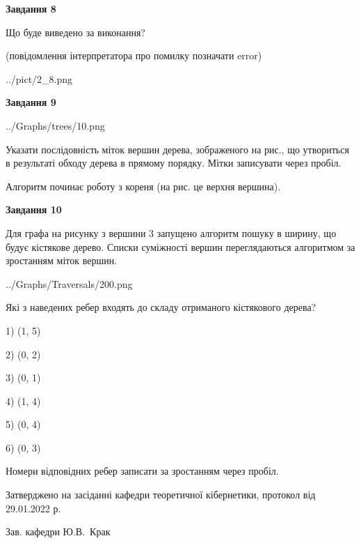 \documentclass[12pt, ukrainian]{article}
\begin{document}
{\begin {large}
{\begin {center}\textbf{Завдання 8}\end {center}}\par
Що буде виведено за виконання?\par
 (повідомлення інтерпретатора про помилку позначати error)\par
\begin{center}
	{../pict/2_8.png}
\end{center}
\newpage

{\begin {center}\textbf{Завдання 9}\end {center}}\par

\begin{center}
	{../Graphs/trees/10.png}
\end{center}
Указати послідовність міток вершин дерева, зображеного на рис., що утвориться в результаті обходу дерева в прямому порядку. Мітки записувати через пробіл.\par Алгоритм починає роботу з кореня (на рис. це верхня вершина).\par
\newpage

{\begin {center}\textbf{Завдання 10}\end {center}}\par
Для графа на рисунку з вершини 3 запущено алгоритм пошуку в ширину, що будує кістякове дерево. Списки суміжності вершин переглядаються алгоритмом за зростанням міток вершин.\par
\begin{center}
	{../Graphs/Traversals/200.png}
\end{center}
\par Які з наведених ребер входять до складу отриманого кістякового дерева?\par
1) (1, 5)\par
2) (0, 2)\par
3) (0, 1)\par
4) (1, 4)\par
5) (0, 4)\par
6) (0, 3)\par
{\vskip 15pt} Номери відповідних ребер записати за зростанням через пробіл.\par
\newpage


\end {large}
}
{\smallskip \begin {small} Затверджено на засіданні кафедри теоретичної кібернетики, протокол  від   29.01.2022 р.\par\smallskip\smallskip
{\parbox {6.5 cm}{Зав. кафедри \dotfill Ю.В.~Крак}} \end{small}}
\end{document}

